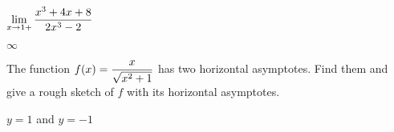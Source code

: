 \begin{exercises}
\exercise $\displaystyle\lim_{x\to1+}{x^3+4x+8\over 2x^3-2}$
\begin{answer} $\infty$
\end{answer}

\endtwocol

\msk
\exercise The function $\displaystyle f(x) = {x\over\sqrt{x^2+1}}$ has two horizontal
 asymptotes.  Find them and give a rough sketch of $f$ with its horizontal
 asymptotes. 
\begin{answer} $y=1$ and $y=-1$
\end{answer}

\end{exercises}

